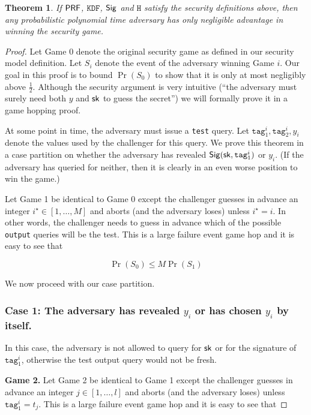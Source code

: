 \documentclass{article}
\newtheorem{theorem}{Theorem}[section]
\begin{document}
\begin{theorem}
If $\mathsf{PRF}$, $\texttt{KDF}$, $\mathsf{Sig}$ and $\texttt{H}$ satisfy the security definitions above, then any probabilistic polynomial time adversary has only negligible advantage in winning the security game.
\end{theorem}

\begin{proof}
Let Game 0 denote the original security game as defined in our security model definition. Let $S_i$ denote the event of the adversary winning Game $i$. Our goal in this proof is to bound $\Pr(S_0)$ to show that it is only at most negligibly above $\frac{1}{2}$. Although the security argument is very intuitive (``the adversary must surely need both $y$ and $\mathsf{sk}$ to guess the secret'') we will formally prove it in a game hopping proof.

At some point in time, the adversary must issue a \texttt{test} query. Let $\texttt{tag}_1^i, \texttt{tag}_2^i, y_i$ denote the values used by the challenger for this query. We prove this theorem in a case partition on whether the adversary has revealed $\mathsf{Sig}(\mathsf{sk},\texttt{tag}_1^i)$ or $y_i$. (If the adversary has queried for neither, then it is clearly in an even worse position to win the game.) 

Let Game 1 be identical to Game 0 except the challenger guesses in advance an integer $i^{\star} \in [1, \dots, M]$ and aborts (and the adversary loses) unless $i^{\star} = i$. In other words, the challenger needs to guess in advance which of the possible \texttt{output} queries will be the test. This is a large failure event game hop and it is easy to see that

$$
\Pr(S_0) \le M \Pr(S_1)
$$

\noindent We now proceed with our case partition.

\subsubsection*{Case 1: The adversary has revealed $y_i$ or has chosen $y_i$ by itself.} In this case, the adversary is not allowed to query for $\mathsf{sk}$ or for the signature of $\texttt{tag}_1^i$, otherwise the test output query would not be fresh.

\noindent \textbf{Game 2.} Let Game 2 be identical to Game 1 except the challenger guesses in advance an integer $j \in [1, \dots, l]$ and aborts (and the adversary loses) unless $\texttt{tag}_1^i = t_j$.  This is a large failure event game hop and it is easy to see that


\end{proof}
\end{document}
